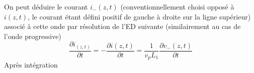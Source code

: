 On peut déduire le courant $i_-(z,t)$ (conventionnellement choisi opposé à $i(z,t)$, 
le courant étant défini positif de gauche à droite sur la ligne supérieur) associé à 
cette onde par résolution de l'ED suivante (similairement au cas de l'onde progressive)
\begin{equation}
\dfrac{\partial i_(z,t)}{\partial t} = -
\dfrac{\partial i(z,t)}{\partial t} = \dfrac{1}{v_pL_1}\dfrac{\partial v_-(z,t)}{\partial t}
\end{equation}
Après intégration
























